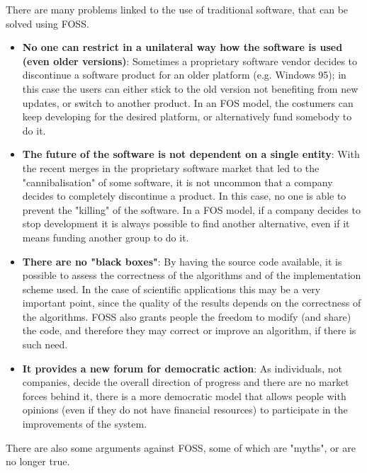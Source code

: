 \documentclass[11pt]{article} %
\begin{document}
There are many problems linked to the use of traditional software, that can be solved using FOSS. 
\begin{itemize}
\item \textbf{No one can restrict in a unilateral way how the software is used (even older versions)}: Sometimes a proprietary software vendor decides to discontinue a software product for an older platform (e.g. Windows 95); in this case the users can either stick to the old version not benefiting from new updates, or switch to another product. In an FOS model, the costumers can keep developing for the desired platform, or alternatively fund somebody to do it. %
\item \textbf{The future of the software is not dependent on a single entity}: With the recent merges in the proprietary software market that led to the "cannibalisation" of some software, it is not uncommon that a company decides to completely discontinue a product. In this case, no one is able to prevent the "killing" of the software. In a FOS model, if a company decides to stop development it is always possible to find another alternative, even if it means funding another group to do it.
\item \textbf{There are no "black boxes"}: By having the source code available, it is possible to assess the correctness of the algorithms and of the implementation scheme used. In the case of scientific applications this may be a very important point, since the quality of the results depends on the correctness of the algorithms. FOSS also grants people the freedom to modify (and share) the code, and therefore they may correct or improve an algorithm, if there is such need.
\item \textbf{It provides a new forum for democratic action}: As individuals, not companies, decide the overall direction of progress and there are no market forces behind it, there is a more democratic model that allows people with opinions (even if they do not have financial resources) to participate in the improvements of the system.
\end{itemize}
There are also some arguments against FOSS, some of which are "myths", or are no longer true.
\end{document}
